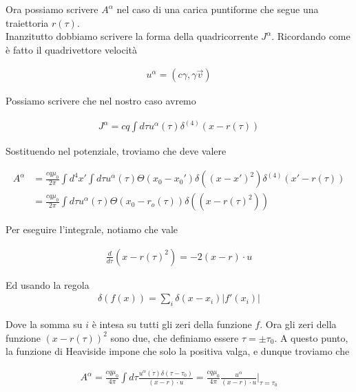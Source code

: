 \documentclass{report}
\begin{document}
Ora possiamo scrivere \(A^{\alpha}\) nel caso di una carica puntiforme che segue una traiettoria \(r(\tau)\). \\

Inanzitutto dobbiamo scrivere la forma della quadricorrente \(J^{\alpha}\). Ricordando come è fatto il quadrivettore velocità

\begin{align}
    u^\alpha = (c\gamma, \gamma\vec{v})
\end{align}

Possiamo scrivere che nel nostro caso avremo 

\begin{align}
    J^\alpha = cq \int d\tau u^\alpha (\tau)\delta^{(4)}(x-r(\tau))
\end{align}

Sostituendo nel potenziale, troviamo che deve valere 

\begin{align}
    A^\alpha &= \frac{cq\mu_0}{2\pi}\int d^4x' \int d\tau u^{\alpha}(\tau)\Theta(x_0 - x_0')\delta((x-x')^2)\delta^{(4)}(x'-r(\tau)) \\
    &= \frac{cq\mu_0}{2\pi}\int d\tau u^{\alpha}(\tau)\Theta(x_0 -r_o(\tau))\delta((x-r(\tau)^2))
\end{align}

Per eseguire l'integrale, notiamo che vale 

\begin{align}
    \frac{d}{d\tau}(x-r(\tau)^2) = -2(x-r)\cdot u
\end{align}

Ed usando la regola 
\begin{align}
\delta(f(x)) = \sum_i \delta(x -x_i)|f'(x_i)|
\end{align}

Dove la somma su \(i\) è intesa su tutti gli zeri della funzione \(f\). Ora gli zeri della funzione \((x-r(\tau))^2\) sono due, che definiamo essere \( \tau = \pm \tau_0\). A questo punto, la funzione di Heaviside impone che solo la positiva valga, e dunque troviamo che 

\begin{tcolorbox}[colback=doc!15, colframe=black, boxrule=1pt]
\begin{align}
    A^\alpha = \frac{cq\mu_0}{4\pi} \int d\tau \frac{u^\alpha(\tau)\delta(\tau-\tau_0)}{(x-r)\cdot u} = \frac{cq\mu_0}{4\pi} \frac{u^\alpha}{(x-r)\cdot u}\biggr|_{\tau = \tau_0}
\end{align}
\end{tcolorbox}
\end{document}
